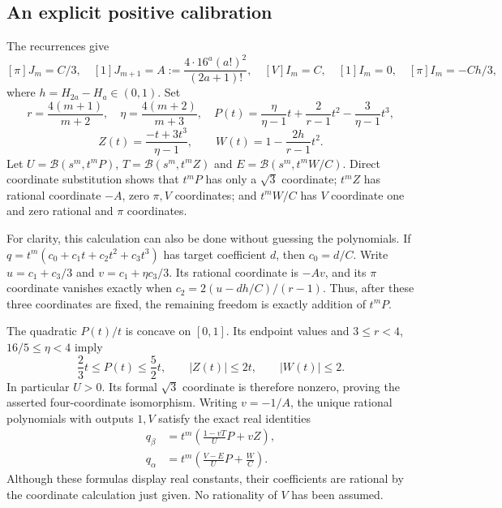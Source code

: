 \documentclass[11pt,a4paper]{article}
\numberwithin{equation}{section}
\theoremstyle{definition}\newtheorem{definition}[theorem]{Definition}
\theoremstyle{remark}\newtheorem{remark}[theorem]{Remark}
\newcommand{\B}{\mathcal B}\newcommand{\N}{\mathcal N}\newcommand{\M}{\mathcal M}
\begin{document}
\subsection{An explicit positive calibration}
The recurrences give
\[
 [\pi]J_m=C/3,\quad [1]J_{m+1}=A:=
 \frac{4\cdot16^a(a!)^2}{(2a+1)!},\quad
 [V]I_m=C,\quad [1]I_m=0,
 \quad [\pi]I_m=-Ch/3,
\]
where $h=H_{2a}-H_a\in(0,1)$. Set
\[
 r=\frac{4(m+1)}{m+2},\quad \eta=\frac{4(m+2)}{m+3},\quad
 P(t)=\frac{\eta}{\eta-1}t+\frac2{r-1}t^2-\frac3{\eta-1}t^3,
\]
\[
 Z(t)=\frac{-t+3t^3}{\eta-1},\qquad
 W(t)=1-\frac{2h}{r-1}t^2.
\]
Let $U=\B(s^m,t^mP)$, $T=\B(s^m,t^mZ)$ and
$E=\B(s^m,t^mW/C)$. 
Direct coordinate substitution shows that $t^mP$ has only a
$\sqrt3$ coordinate; $t^mZ$ has rational coordinate $-A$, zero
$\pi,V$ coordinates; and $t^mW/C$ has $V$ coordinate one and
zero rational and $\pi$ coordinates.

For clarity, this calculation can also be done without guessing the
polynomials. If $q=t^m(c_0+c_1t+c_2t^2+c_3t^3)$ has target
coefficient $d$, then $c_0=d/C$. Write
$u=c_1+c_3/3$ and $v=c_1+\eta c_3/3$. Its rational coordinate
is $-Av$, and its $\pi$ coordinate vanishes exactly when
$c_2=2(u-dh/C)/(r-1)$. Thus, after these three coordinates
are fixed, the remaining freedom is exactly addition of $t^mP$.

The quadratic $P(t)/t$ is concave on $[0,1]$. Its endpoint
values and $3\le r<4$, $16/5\le\eta<4$ imply
\begin{equation}\label{calbase:bounds1}
 \frac23t\le P(t)\le\frac52t,\qquad |Z(t)|\le2t,
 \qquad |W(t)|\le2.
\end{equation}
In particular $U>0$. Its formal $\sqrt3$ coordinate is therefore
nonzero, proving the asserted four-coordinate isomorphism.
Writing $v=-1/A$, the unique rational polynomials with outputs
$1,V$ satisfy the exact real identities
\begin{align}
 q_\beta&=t^m\left(\frac{1-vT}{U}P+vZ\right),\label{calbase:qbeta}\\
 q_\alpha&=t^m\left(\frac{V-E}{U}P+\frac WC\right).
 \label{calbase:qalpha}
\end{align}
Although these formulas display real constants, their coefficients are
rational by the coordinate calculation just given. No rationality of
$V$ has been assumed.
\end{document}
